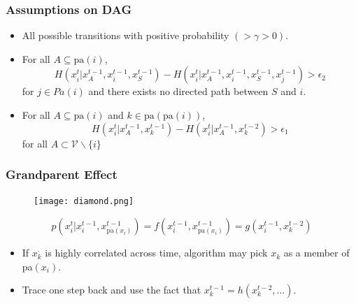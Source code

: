 \documentclass{beamer}
\begin{document}
\begin{frame}
\frametitle{Assumptions on DAG}
\begin{itemize}
\item All possible transitions with positive probability $(> \gamma > 0)$.
\item For all $A \subseteq \text{pa}(i)$, $$H(x^t_i|x^{t-1}_A, x^{t-1}_i, x^{t-1}_S) - H(x^t_i|x^{t-1}_A, x^{t-1}_i, x^{t-1}_S, x^{t-1}_j) > \epsilon_2$$ for $j \in Pa(i)$ and there exists no directed path between $S$ and $i$.
\item For all $A \subseteq \text{pa}(i)$ and $k \in \text{pa}(\text{pa}(i))$, $$ H(x^t_i|x^{t-1}_A, x^{t-1}_k) - H(x^t_i|x^{t-1}_A, x^{t-2}_k) > \epsilon_1 $$ for all $A \subset \mathcal{V} \backslash \{i\}$
\end{itemize}
\end{frame}

\begin{frame}
\frametitle{Grandparent Effect}
\footnotesize
\begin{figure}
	\centering
		\texttt{[image: diamond.png]}
\end{figure}
$$p\left(x^{t}_{i}|x^{t-1}_{i}, x^{t-1}_{\text{pa}(x_i)}\right) = f(x^{t-1}_{i}, x^{t-1}_{\text{pa}(x_i)}) = g(x^{t-1}_{i}, x^{t-2}_k)$$
\begin{itemize}
\item If $x^{\cdot}_k$ is highly correlated across time, algorithm may pick $x_k$ as a member of pa$(x_i)$.
\item Trace one step back and use the fact that $x^{t-1}_k = h(x_k^{t-2},\ldots)$.
\end{itemize}
\end{frame}
\end{document}
